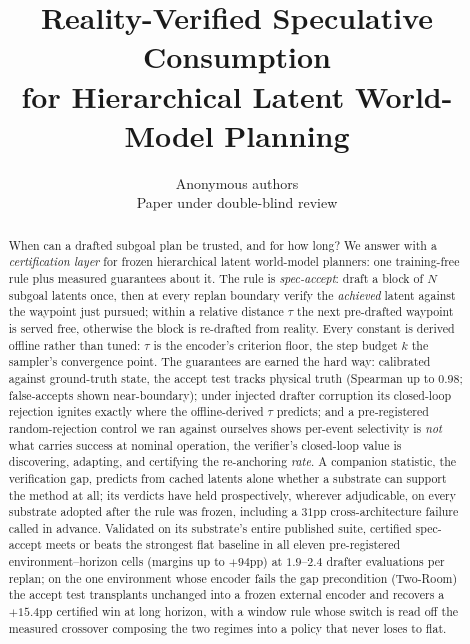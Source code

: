 \documentclass{article}
\title{Reality-Verified Speculative Consumption\\
for Hierarchical Latent World-Model Planning}
\author{Anonymous authors \\ Paper under double-blind review}
\begin{document}
\maketitle

\begin{abstract}
When can a drafted subgoal plan be trusted, and for how long? We answer with a
\emph{certification layer} for frozen hierarchical latent world-model planners:
one training-free rule plus measured guarantees about it. The rule is
\emph{spec-accept}: draft a block of $N$ subgoal latents once, then at every
replan boundary verify the \emph{achieved} latent against the waypoint just
pursued; within a relative distance $\tau$ the next pre-drafted waypoint is
served free, otherwise the block is re-drafted from reality. Every constant
is derived offline rather than tuned: $\tau$ is the encoder's
criterion floor, the step budget $k$ the sampler's convergence point. The
guarantees are earned the hard way: calibrated against ground-truth state, the
accept test tracks physical truth (Spearman up to $0.98$; false-accepts shown
near-boundary); under injected drafter
corruption its closed-loop rejection ignites exactly where the offline-derived
$\tau$ predicts; and a pre-registered random-rejection control we ran against
ourselves shows per-event selectivity is \emph{not} what carries success at
nominal operation, the verifier's closed-loop value is discovering, adapting,
and certifying the re-anchoring \emph{rate}. A companion statistic, the
verification gap, predicts from cached latents alone whether a substrate can
support the method at all; its verdicts have held prospectively, wherever
adjudicable, on every substrate adopted after the rule was frozen, including a
$31$pp cross-architecture failure called in advance. Validated on its substrate's entire published suite,
certified spec-accept meets or beats the strongest flat baseline in all eleven
pre-registered environment--horizon cells (margins up to $+94$pp) at
$1.9$--$2.4$ drafter evaluations per replan; on the one environment whose
encoder fails the gap precondition (Two-Room) the accept test transplants
unchanged into a frozen external encoder and recovers a $+15.4$pp certified
win at long horizon, with a window rule whose switch is read off the measured
crossover composing the two regimes into a policy that never loses to flat.
\end{abstract}

\end{document}
